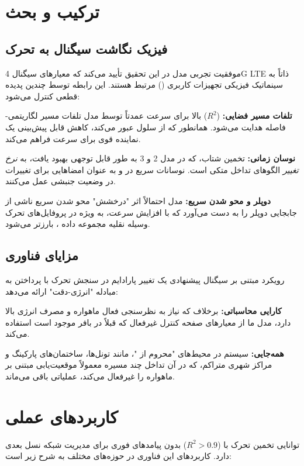 \documentclass{CSICC}
\begin{document}
\section{ترکیب و بحث}

\subsection{فیزیک نگاشت سیگنال به تحرک}
موفقیت تجربی مدل  در این تحقیق تأیید می‌کند که معیارهای سیگنال 4G LTE ذاتاً به سینماتیک فیزیکی تجهیزات کاربری () مرتبط هستند. این رابطه توسط چندین پدیده قطعی کنترل می‌شود:

\textbf{تلفات مسیر فضایی:} (\(R^{2}\)) بالا برای سرعت عمدتاً توسط مدل تلفات مسیر لگاریتمی-فاصله هدایت می‌شود. همانطور که  از سلول عبور می‌کند، کاهش قابل پیش‌بینی  یک نماینده قوی برای سرعت فراهم می‌کند.

\textbf{نوسان زمانی:} تخمین شتاب، که در مدل 2 و 3 به طور قابل توجهی بهبود یافت، به \textit{نرخ تغییر} الگوهای تداخل متکی است. نوسانات سریع در  و  به عنوان امضاهایی برای تغییرات در وضعیت جنبشی  عمل می‌کنند.

\textbf{دوپلر و محو شدن سریع:} مدل احتمالاً اثر "درخشش" محو شدن سریع ناشی از جابجایی دوپلر را به دست می‌آورد که با افزایش سرعت، به ویژه در پروفایل‌های تحرک وسیله نقلیه مجموعه داده ، بارزتر می‌شود.

\subsection{مزایای فناوری}
رویکرد مبتنی بر سیگنال پیشنهادی یک تغییر پارادایم در سنجش تحرک با پرداختن به مبادله "انرژی-دقت" ارائه می‌دهد:

\textbf{کارایی محاسباتی:} برخلاف  که نیاز به نظرسنجی فعال ماهواره و مصرف انرژی بالا دارد، مدل ما از معیارهای صفحه کنترل غیرفعال که قبلاً در بافر  موجود است استفاده می‌کند.

\textbf{همه‌جایی:} سیستم در محیط‌های "محروم از "، مانند تونل‌ها، ساختمان‌های پارکینگ و مراکز شهری متراکم، که در آن تداخل چند مسیره معمولاً موقعیت‌یابی مبتنی بر ماهواره را غیرفعال می‌کند، عملیاتی باقی می‌ماند.

\section{کاربردهای عملی}
توانایی تخمین تحرک با (\(R^{2}>0.9\)) بدون  پیامدهای فوری برای مدیریت شبکه نسل بعدی دارد. کاربردهای این فناوری در حوزه‌های مختلف به شرح زیر است:
\end{document}
